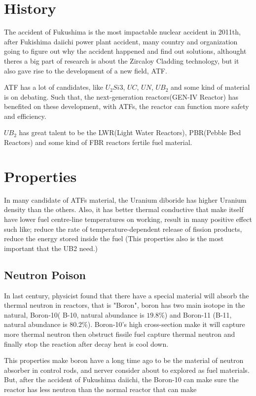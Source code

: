 \documentclass[final,10pt,times,twocolumn]{elsarticle}
\begin{document}
\section{History}
The accident of Fukushima is the most impactable nuclear accident in 2011th, after Fukishima daiichi power plant accident, many country and organization going to figure out why the accident happened and find out solutions, althought theres a big part of research is about the Zircaloy Cladding technology, but it also gave rise to the development of a new field, ATF.

ATF has a lot of candidates, like $U_{2}Si{3}$, $UC$, $UN$, $UB_{2}$ and some kind of material is on debating. Such that, the next-generation reactors(GEN-IV Reactor) has benefited on these development, with ATFs, the reactor can function more safety and efficiency.

$UB_{2}$ has great talent to be the LWR(Light Water Reactors), PBR(Pebble Bed Reactors) and some kind of FBR reactors fertile fuel material.

\section{Properties}
In many candidate of ATFs material, the Uranium diboride has higher Uranium density than the others. Also, it has better thermal conductive that make itself have lower fuel centre-line temperatures on working, result in many positive effect such like; reduce the rate of temperature-dependent release of fission products, reduce the energy stored inside the fuel (This properties also is the most important that the UB2 need.)

\subsection{Neutron Poison}
In last century, physicist found that there have a special material will absorb the thermal neutron in reactors, that is "Boron", boron has two main isotope in the natural, Boron-10( B-10, natural abundance is $19.8\%$) and Boron-11 (B-11, natural abundance is $80.2\%$). Boron-10's high cross-section make it will capture more thermal neutron then obstruct fissile fuel capture thermal neutron and finally stop the reaction after decay heat is cool down.

This properties make boron have a long time ago to be the material of neutron absorber in control rods, and nerver consider about to explored as fuel materials. But, after the accident of Fukushima daiichi, the Boron-10 can make sure the reactor has less neutron than the normal reactor that can make 
\end{document}
